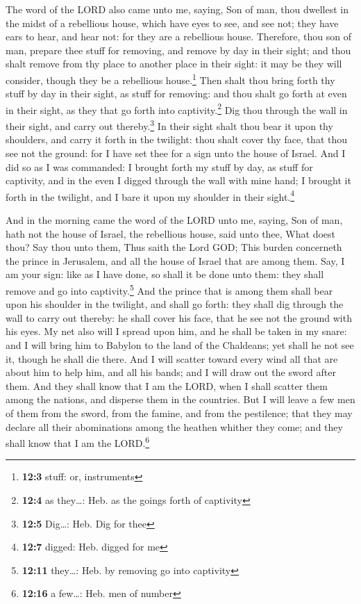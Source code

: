  The word of the LORD also came unto me, saying,
 Son of man, thou dwellest in the midst of a rebellious
house, which have eyes to see, and see not; they have ears to hear, and
hear not: for they are a rebellious house.  Therefore,
thou son of man, prepare thee stuff for removing, and remove by day in
their sight; and thou shalt remove from thy place to another place in
their sight: it may be they will consider, though they be a rebellious
house.\footnote{\textbf{12:3} stuff: or, instruments} 
Then shalt thou bring forth thy stuff by day in their sight, as stuff
for removing: and thou shalt go forth at even in their sight, as they
that go forth into captivity.\footnote{\textbf{12:4} as they\ldots: Heb.
  as the goings forth of captivity}  Dig thou through the
wall in their sight, and carry out thereby.\footnote{\textbf{12:5}
  Dig\ldots: Heb. Dig for thee}  In their sight shalt thou
bear it upon thy shoulders, and carry it forth in the twilight: thou
shalt cover thy face, that thou see not the ground: for I have set thee
for a sign unto the house of Israel.  And I did so as I
was commanded: I brought forth my stuff by day, as stuff for captivity,
and in the even I digged through the wall with mine hand; I brought it
forth in the twilight, and I bare it upon my shoulder in their
sight.\footnote{\textbf{12:7} digged: Heb. digged for me}

 And in the morning came the word of the LORD unto me,
saying,  Son of man, hath not the house of Israel, the
rebellious house, said unto thee, What doest thou?  Say
thou unto them, Thus saith the Lord GOD; This burden concerneth the
prince in Jerusalem, and all the house of Israel that are among them.
 Say, I am your sign: like as I have done, so shall it be
done unto them: they shall remove and go into captivity.\footnote{\textbf{12:11}
  they\ldots: Heb. by removing go into captivity}  And
the prince that is among them shall bear upon his shoulder in the
twilight, and shall go forth: they shall dig through the wall to carry
out thereby: he shall cover his face, that he see not the ground with
his eyes.  My net also will I spread upon him, and he
shall be taken in my snare: and I will bring him to Babylon to the land
of the Chaldeans; yet shall he not see it, though he shall die there.
 And I will scatter toward every wind all that are about
him to help him, and all his bands; and I will draw out the sword after
them.  And they shall know that I am the LORD, when I
shall scatter them among the nations, and disperse them in the
countries.  But I will leave a few men of them from the
sword, from the famine, and from the pestilence; that they may declare
all their abominations among the heathen whither they come; and they
shall know that I am the LORD.\footnote{\textbf{12:16} a few\ldots: Heb.
  men of number}

